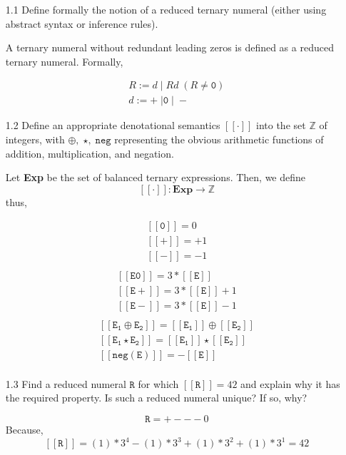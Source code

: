 \documentclass[a4paper,10pt]{article}
\newcommand{\R}{\mathtt{R}}
\newcommand{\negation}{\mathtt{neg}}
\newcommand{\denot}[1]{\mathtt{[[{#1}]]}}
\newcommand{\question}[1]
{\color{DarkBlue}#1 \color{Black} \newline}
\begin{document}
\begin{enumerate}

\question{
\item[1.1] Define formally the notion of a reduced ternary numeral (either using abstract syntax or inference rules).
}

A ternary numeral without redundant leading zeros is defined as a reduced
ternary numeral. Formally, 

\begin{gather*}
R := d \; | \; Rd \; (R \neq \mathtt{0}) \\
d := + \; | \mathtt{0} \; | \; - 
\end{gather*}

\question{
\item[1.2] Define an appropriate denotational semantics $\denot{\cdot}$ into the
set $\mathbb{Z}$ of integers, with $\oplus, \; \star, \; \negation$ representing 
the obvious arithmetic functions of addition, multiplication, and negation.
}

Let \textbf{Exp} be the set of balanced ternary expressions. Then, we define
$$\denot{\cdot} : \textbf{Exp} \rightarrow \mathbb{Z}$$ thus,

\begin{gather*}
\denot{0} = 0 \\
\denot{+} = +1 \\
\denot{-} = -1 \\
\end{gather*}
\begin{gather*}
\denot{E0} = 3*\denot{E} \\
\denot{E+} = 3*\denot{E} + 1 \\
\denot{E-} = 3*\denot{E} - 1 \\
\end{gather*}
\begin{gather*}
\denot{E_{1} \oplus E_{2}} = \denot{E_{1}} \oplus \denot{E_{2}} \\
\denot{E_{1} \star E_{2}} = \denot{E_{1}} \star \denot{E_{2}} \\
\denot{neg(E)} = -\denot{E} \\
\end{gather*}

\question{
\item[1.3] Find a reduced numeral $\R$ for which $\denot{\R} = 42$ and
explain why it has the required property. Is such a reduced numeral unique? If
so, why?
}

$$ \R = +---0 $$  Because, $$\denot{\R} = (1) * 3^{4} - (1) * 3^{3} + (1) *
3^{2} + (1) * 3^{1} = 42$$


\end{enumerate}
\end{document}
